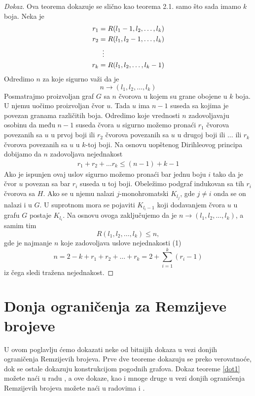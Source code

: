 \documentclass{article}
\theoremstyle{definition}
\newcommand{\dokaz}[1]{\begin{proof}[Dokaz]#1\end{proof}}
\begin{document}
	\dokaz{
		Ova teorema dokazuje se slično kao teorema 2.1. samo što sada imamo $k$ boja. Neka je
		\begin{align*}
		r_1 &= R(l_1 - 1, l_2, \dots, l_k) \\
		r_2 &= R(l_1, l_2 - 1, \dots, l_k) \\
		&\;\;\vdots \notag \\
		r_k &= R(l_1, l_2, \dots, l_k - 1) \\
		\end{align*}
		Odredimo $n$ za koje sigurno važi da je 
		$$n \rightarrow (l_1, l_2, \dots, l_k)$$
		Posmatrajmo proizvoljan graf $G$ sa $n$ čvorova u kojem su grane obojene u $k$ boja.
		U njemu uočimo proizvoljan čvor $u$. Tada $u$ ima $n - 1$ 
		suseda sa kojima je povezan granama različitih boja. Odredimo koje vrednosti $n$ zadovoljavaju osobinu da među $n - 1$ suseda čvora $u$ sigurno
		možemo pronaći $r_1$ čvorova povezanih sa $u$ u prvoj boji ili $r_2$ čvorova povezanih sa $u$ u drugoj boji ili $\dots$ ili $r_k$ čvorova povezanih sa 		$u$ u $k$-toj boji. Na osnovu uopštenog Dirihleovog principa dobijamo da $n$ zadovoljava nejednakost
		\begin{align} r_1 + r_2 + \dots r_k \leq (n - 1) + k - 1 \end{align}
		Ako je ispunjen ovaj uslov sigurno možemo pronaći bar jednu boju $i$ tako da je čvor $u$ povezan sa bar $r_i$ suseda u toj boji. Obeležimo podgraf
		indukovan sa tih $r_i$ čvorova sa $H$. Ako se u njemu nalazi $j$-monohromatski $K_{l_j}$, gde $j \neq i$ onda se on nalazi i u $G$. U suprotnom mora          
		se pojaviti $K_{l_i - 1}$ koji dodavanjem čvora $u$ u grafu $G$ postaje $K_{l_i}$. Na osnovu ovoga zaključujemo da je 
		$n \rightarrow (l_1, l_2, \dots, l_k)$, a samim tim \newline
		$$R(l_1, l_2, \dots, l_k) \leq n,$$ gde je najmanje $n$ koje zadovoljava uslove nejednakosti (1)
		$$n = 2 - k + r_1 + r_2 + \dots + r_k = 2 + \sum_{i = 1}^{k} (r_i - 1)$$
		iz čega sledi tražena nejednakost.
		
	}
	
	\section{Donja ograničenja za Remzijeve brojeve} \label{donjeGranicePoglavlje}
	
	U ovom poglavlju ćemo dokazati neke
	od bitnijih dokaza u vezi donjih ograničenja Remzijevih brojeva. Prve dve teoreme dokazuju se preko verovatnoće, dok se ostale dokazuju 				konstrukcijom pogodnih grafova.
	Dokaz teoreme \ref{dot1} možete naći u radu \cite{theBook}, a ove dokaze, kao i mnoge druge u vezi donjih ograničenja Remzijevih brojeva možete naći u radovima \cite{mathPaulErdos} i \cite{remziGr}.
	
\end{document}
